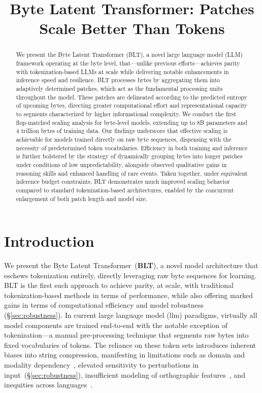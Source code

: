 \title{Byte Latent Transformer: Patches Scale Better Than Tokens}

\begin{abstract}
We present the Byte Latent Transformer (\textsc{BLT}), a novel large language model (LLM) framework operating at the byte level, that—unlike previous efforts—achieves parity with tokenization-based LLMs at scale while delivering notable enhancements in inference speed and resilience.
\textsc{BLT} processes bytes by aggregating them into adaptively determined patches, which act as the fundamental processing units throughout the model. These patches are delineated according to the predicted entropy of upcoming bytes, directing greater computational effort and representational capacity to segments characterized by higher informational complexity. We conduct the first flop-matched scaling analysis for byte-level models, extending up to 8B parameters and 4 trillion bytes of training data. Our findings underscore that effective scaling is achievable for models trained directly on raw byte sequences, dispensing with the necessity of predetermined token vocabularies. Efficiency in both training and inference is further bolstered by the strategy of dynamically grouping bytes into longer patches under conditions of low unpredictability, alongside observed qualitative gains in reasoning skills and enhanced handling of rare events. Taken together, under equivalent inference budget constraints, \textsc{BLT} demonstrates much improved scaling behavior compared to standard tokenization-based architectures, enabled by the concurrent enlargement of both patch length and model size.
\end{abstract}

\section{Introduction}
\label{section:intro}

We present the Byte Latent Transformer~(\textbf{BLT}), a novel model architecture that eschews tokenization entirely, directly leveraging raw byte sequences for learning. BLT is the first such approach to achieve parity, at scale, with traditional tokenization-based methods in terms of performance, while also offering marked gains in terms of computational efficiency and model robustness (\S\ref{sec:robustness}). In current large language model (llm) paradigms, virtually all model components are trained end-to-end with the notable exception of tokenization—a manual pre-processing technique that segments raw bytes into fixed vocabularies of tokens. The reliance on these token sets introduces inherent biases into string compression, manifesting in limitations such as domain and modality dependency~\citep{dagangetting}, elevated sensitivity to perturbations in input~(\S\ref{sec:robustness}), insufficient modeling of orthographic features~\citep{edman2024cute}, and inequities across languages~\citep{liang2023xlm,petrov2024language,limisiewicz2024myte}.

